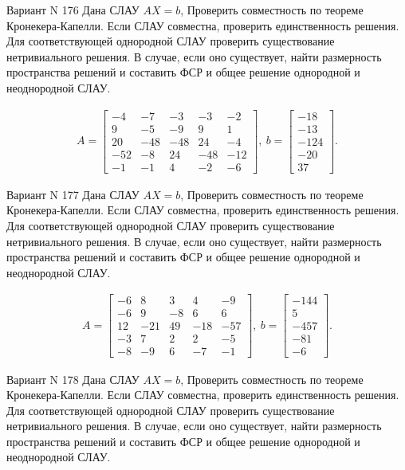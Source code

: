 \documentclass[11pt]{report}
\begin{document}
Вариант N 176
Дана СЛАУ $AX = b$,
Проверить совместность по теореме Кронекера-Капелли. Если СЛАУ совместна, проверить единственность решения.
Для соответствующей однородной СЛАУ проверить существование нетривиального решения. В случае, если оно существует,
найти размерность пространства решений и составить ФСР и общее решение однородной  и неоднородной СЛАУ.


\begin{align*}
 A = \left[\begin{matrix}-4 & -7 & -3 & -3 & -2\\9 & -5 & -9 & 9 & 1\\20 & -48 & -48 & 24 & -4\\-52 & -8 & 24 & -48 & -12\\-1 & -1 & 4 & -2 & -6\end{matrix}\right],
\ b = \left[\begin{matrix}-18\\-13\\-124\\-20\\37\end{matrix}\right]. 
 \end{align*}

Вариант N 177
Дана СЛАУ $AX = b$,
Проверить совместность по теореме Кронекера-Капелли. Если СЛАУ совместна, проверить единственность решения.
Для соответствующей однородной СЛАУ проверить существование нетривиального решения. В случае, если оно существует,
найти размерность пространства решений и составить ФСР и общее решение однородной  и неоднородной СЛАУ.


\begin{align*}
 A = \left[\begin{matrix}-6 & 8 & 3 & 4 & -9\\-6 & 9 & -8 & 6 & 6\\12 & -21 & 49 & -18 & -57\\-3 & 7 & 2 & 2 & -5\\-8 & -9 & 6 & -7 & -1\end{matrix}\right],
\ b = \left[\begin{matrix}-144\\5\\-457\\-81\\-6\end{matrix}\right]. 
 \end{align*}

Вариант N 178
Дана СЛАУ $AX = b$,
Проверить совместность по теореме Кронекера-Капелли. Если СЛАУ совместна, проверить единственность решения.
Для соответствующей однородной СЛАУ проверить существование нетривиального решения. В случае, если оно существует,
найти размерность пространства решений и составить ФСР и общее решение однородной  и неоднородной СЛАУ.
\end{document}
